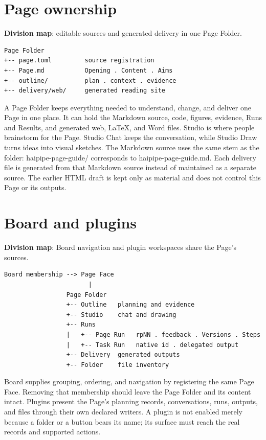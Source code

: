 
\section{Page ownership}
\textbf{Division map}: editable sources and generated delivery in one Page Folder.

\begin{verbatim}
Page Folder
+-- page.toml         source registration
+-- Page.md           Opening . Content . Aims
+-- outline/          plan . context . evidence
+-- delivery/web/     generated reading site
\end{verbatim}
A Page Folder keeps everything needed to understand, change, and deliver one Page in one place. It can hold the Markdown source, code, figures, evidence, Runs and Results, and generated web, LaTeX, and Word files. Studio is where people brainstorm for the Page. Studio Chat keeps the conversation, while Studio Draw turns ideas into visual sketches. The Markdown source uses the same stem as the folder: haipipe-page-guide/ corresponds to haipipe-page-guide.md. Each delivery file is generated from that Markdown source instead of maintained as a separate source. The earlier HTML draft is kept only as material and does not control this Page or its outputs.


\section{Board and plugins}
\textbf{Division map}: Board navigation and plugin workspaces share the Page's sources.

\begin{verbatim}
Board membership --> Page Face
                       |
                 Page Folder
                 +-- Outline   planning and evidence
                 +-- Studio    chat and drawing
                 +-- Runs
                 |   +-- Page Run   rpNN . feedback . Versions . Steps
                 |   +-- Task Run   native id . delegated output
                 +-- Delivery  generated outputs
                 +-- Folder    file inventory
\end{verbatim}
Board supplies grouping, ordering, and navigation by registering the same Page Face. Removing that membership should leave the Page Folder and its content intact. Plugins present the Page's planning records, conversations, runs, outputs, and files through their own declared writers. A plugin is not enabled merely because a folder or a button bears its name; its surface must reach the real records and supported actions.

